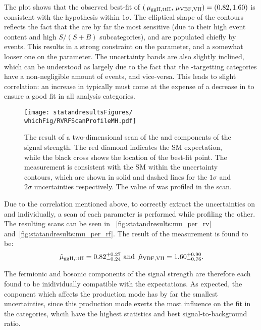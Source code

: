 The plot shows that the observed best-fit of $(\,\mu_{\text{ggH},\text{ttH}} ,\,\mu_{\text{VBF},\text{VH}} )=(0.82,1.60)$ is consistent with the \SM hypothesis within $1\sigma$. The elliptical shape of the contours reflects the fact that the \Untagged are by far the most sensitive (due to their high event content and high $S/(S+B)$ subcategories), and are populated chiefly by \ggH events. This results in a strong constraint on the \muF parameter, and a somewhat looser one on the \muV parameter. The uncertainty bands are also slightly inclined, which can be understood as largely due to the fact that the \VBF-targetting categories have a non-negligible amount of \ggH events, and vice-versa. This leads to slight correlation: an increase in \muF typically must come at the expense of a decrease in \muV to ensure a good fit in all analysis categories.


\begin{figure}[ht!]
\centering
\texttt{[image: statandresultsFigures/\\whichFig/RVRFScanProfileMH.pdf]} 
\caption{The result of a two-dimensional \DNLL scan of the \muF and \muV components of the signal strength. The red diamond indicates the SM expectation, while the black cross shows the location of the best-fit point. The measurement is consistent with the SM within the uncertainty contours, which are shown in solid and dashed lines for the $1\sigma$ and $2\sigma$ uncertainties respectively. The value of \mH was profiled in the scan.}

\label{fig:statandresults:mu_per_rvrf}
\end{figure}

Due to the correlation mentioned above, to correctly extract the uncertainties on \muF and \muV individually, a \DNLL scan of each parameter is performed while profiling the other. The resulting scans can be seen in \Fig\s~\ref{fig:statandresults:mu_per_rv} and~\ref{fig:statandresults:mu_per_rf}. The result of the measurement is found to be:
\begin{equation*}
\,\hat{\mu}_{\text{ggH},\text{ttH}}=0.82^{+0.27}_{-0.24} \text{ and } \,\hat{\mu}_{\text{VBF},\text{VH}}=1.60^{+0.90}_{-0.76}. 
\end{equation*}

The fermionic and bosonic components of the signal strength are therefore each found to be inidividually compatible with the \SM expectations. As expected, the conponent which affects the \ggH production mode has by far the smallest uncertainties, since this production mode exerts the most influence on the fit in the \Untagged categories, whcih have the highest statistics and best signal-to-background ratio. 

